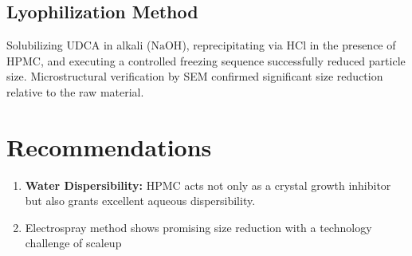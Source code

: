 \documentclass[11pt,a4paper]{article}
\begin{document}
\subsection{Lyophilization Method}
Solubilizing UDCA in alkali ($\text{NaOH}$), reprecipitating via $\text{HCl}$ in the presence of HPMC, and executing a controlled freezing sequence successfully reduced particle size. Microstructural verification by SEM confirmed significant size reduction relative to the raw material.

\section{Recommendations}
\begin{enumerate}
    \item \textbf{Water Dispersibility:} HPMC acts not only as a crystal growth inhibitor but also grants excellent aqueous dispersibility.
    \item Electrospray method shows promising size reduction with a technology challenge of scaleup
\end{enumerate}
\end{document}
